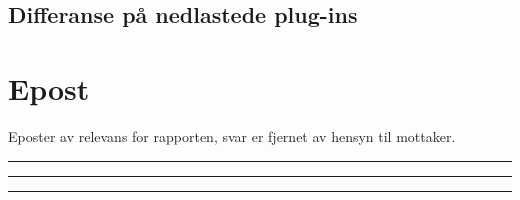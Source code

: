 \documentclass[a4paper,twoside,11pt,pdftex,norsk]{report}
\newenvironment{changemargin}[2]{%
\begin{list}{}{%
\linespread{0.9}%
\setlength{\topsep}{0pt}%
\setlength{\leftmargin}{#1}%
\setlength{\rightmargin}{#2}%
\setlength{\listparindent}{\parindent}%
\setlength{\itemindent}{\parindent}%
\setlength{\parsep}{\parskip}%
}%
\item[]}{\end{list}}
\begin{document}
\begin{appendices}
\begin{changemargin}{-1cm}{-1cm}
\section{Differanse på nedlastede plug-ins}

\end{changemargin}

\chapter{Epost}\label{epost}
Eposter av relevans for rapporten, svar er fjernet av hensyn til mottaker.
\clearpage

\noindent\rule{\textwidth}{0.4pt}

\noindent\rule{\textwidth}{0.4pt}

\clearpage

\noindent\rule{\textwidth}{0.4pt}

\clearpage

\clearpage
{}
\end{appendices}
\end{document}
